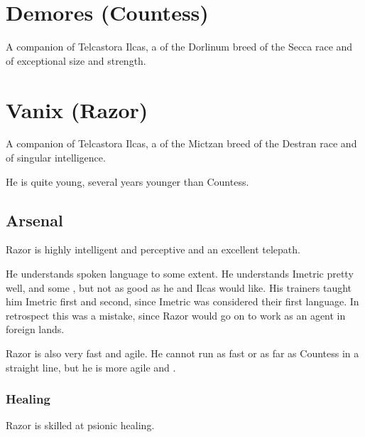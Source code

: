\section{Demores (Countess)}
A companion of Telcastora Ilcas, a \nycan{} of the Dorlinum breed of the Secca race and of exceptional size and strength.



















\section{Vanix (Razor)}
A companion of Telcastora Ilcas, a \nycan{} of the Mictzan breed of the Destran race and of singular intelligence. 

He is quite young, several years younger than Countess. 









\subsection{Arsenal}
Razor is highly intelligent and perceptive and an excellent telepath. 

He understands spoken language to some extent. 
He understands Imetric pretty well, and some \Velcadian, but not as good as he and Ilcas would like. 
His trainers taught him Imetric first and \Velcadian{} second, since Imetric was considered their first language. 
In retrospect this was a mistake, since Razor would go on to work as an agent in foreign lands. 

Razor is also very fast and agile. 
He cannot run as fast or as far as Countess in a straight line, but he is more agile and \manoeuvrable. 





\subsubsection{Healing}
Razor is skilled at psionic healing. 









